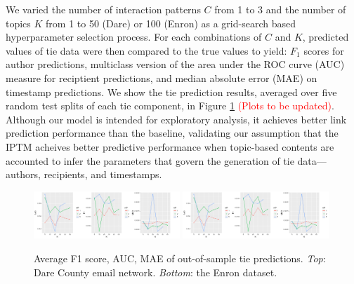 \documentclass{article}
\begin{document}
We varied the number of interaction patterns $C$ from 1 to 3 and the number of topics $K$ from 1 to 50 (Dare) or 100 (Enron) as a grid-search based hyperparameter selection process.  For each combinations of $C$ and $K$, predicted values of tie data were then compared to the true values to yield: $F_1$ scores for author predictions, multiclass version of the area under the ROC curve (AUC) measure \cite{hand2001simple} for reciptient predictions, and median absolute error (MAE) on timestamp predictions. We show the tie prediction results, averaged over five random test splits of each tie component, in Figure \ref{fig:PPE} \textcolor{red}{(Plots to be updated)}. Although our model is intended for exploratory analysis, it achieves better link prediction performance than the baseline, validating our assumption that the IPTM acheives better predictive performance when topic-based contents are accounted to infer the parameters that govern the generation of tie data---authors, recipients, and timestamps.
\begin{figure}[tb]
	\centering
	\includegraphics[width = 0.49\textwidth, trim= 0.7cm 0cm 0cm 0cm, clip=true]{plots/Dare_PPE.pdf} 
		\includegraphics[width = 0.49\textwidth, trim= 0.7cm 0cm 0cm 0cm, clip=true]{plots/Dare_PPE.pdf}   
	\caption{Average F1 score,  AUC, MAE of out-of-sample tie predictions. \textit{Top}: Dare County email network. \textit{Bottom}: the Enron dataset.}
	\label{fig:PPE}	
\end{figure}
\end{document}
